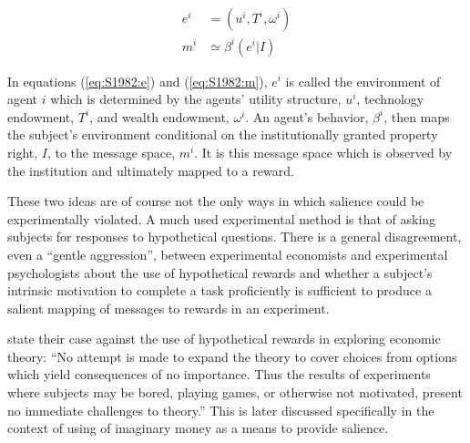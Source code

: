\documentclass[../main.tex]{subfiles}
\begin{document}
\begin{align}
	e^i &= (u^i, T^i, \omega^i)\label{eq:S1982:e}\\
	m^i &\simeq \beta^i(e^i|I)\label{eq:S1982:m}
\end{align}

In equations (\ref{eq:S1982:e}) and (\ref{eq:S1982:m}), $e^i$ is called the environment of agent $i$ which is determined by the agents' utility structure, $u^i$, technology endowment, $T^i$, and wealth endowment, $\omega^i$.
An agent's behavior, $\beta^i$, then maps the subject's environment conditional on the institutionally granted property right, $I$, to the message space, $m^i$.
It is this message space which is observed by the institution and ultimately mapped to a reward.

These two ideas are of course not the only ways in which salience could be experimentally violated.
A much used experimental method is that of asking subjects for responses to hypothetical questions.
There is a general disagreement, even a \enquote{gentle aggression}{\footnotemark}, between experimental economists and experimental psychologists about the use of hypothetical rewards and whether a subject's intrinsic motivation to complete a task proficiently is sufficient to produce a salient mapping of messages to  rewards in an experiment.
\addtocounter{footnote}{-1}

\textcite[624]{Grether1979} state their case against the use of hypothetical rewards in exploring economic theory:
\enquote{No attempt is made to expand the theory to cover choices from options which yield consequences of no importance.\textelp{} Thus the results of experiments where subjects may be bored, playing games, or otherwise not motivated, present no immediate challenges to theory.} 
This is later discussed specifically in the context of using of imaginary money as a means to provide salience.
\end{document}
